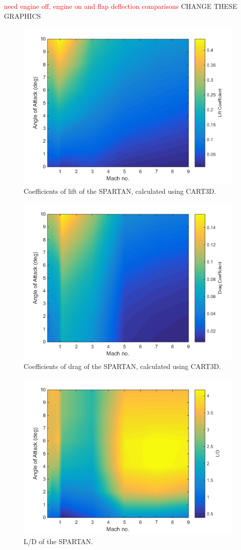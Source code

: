 \textcolor{red}{need engine off, engine on and flap deflection comparisons}
CHANGE THESE GRAPHICS
\begin{figure}
\centering
\includegraphics[width=0.7\linewidth]{figures/3_vehicle_design/Cl}
\caption{Coefficients of lift of the SPARTAN, calculated using CART3D.}
\label{fig:Cl}
\end{figure}
\begin{figure}
\centering
\includegraphics[width=0.7\linewidth]{figures/3_vehicle_design/Cd}
\caption{Coefficients of drag of the SPARTAN, calculated using CART3D.}
\label{fig:Cd}
\end{figure}
\begin{figure}
\centering
\includegraphics[width=0.7\linewidth]{figures/3_vehicle_design/LD}
\caption{L/D of the SPARTAN.}
\label{fig:LD}
\end{figure}

